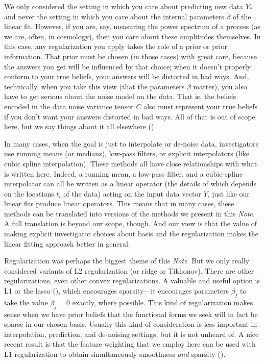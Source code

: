 \documentclass[12pt,letterpaper]{article}
\newcommand{\documentname}{\textsl{Note}}
\begin{document}
We only considered the setting in which you care about predicting new data $Y_\ast$ and never the setting in which you care about the internal parameters $\beta$ of the linear fit.
However, if you are, say, measuring the power spectrum of a process (as we are, often, in cosmology), then you care about these amplitudes themselves.
In this case, any regularization you apply takes the role of a prior or prior information.
That prior must be chosen (in those cases) with great care, because the answers you get will be influenced by that choice; when it doesn't properly conform to your true beliefs, your answers will be distorted in bad ways.
And, technically, when you take this view (that the parameters $\beta$ matter), you also have to get serious about the noise model on the data.
That is, the beliefs encoded in the data noise variance tensor $C$ also must represent your true beliefs if you don't want your answers distorted in bad ways.
All of that is out of scope here, but we say things about it all elsewhere (\citealt{fitting}).

In many cases, when the goal is just to interpolate or de-noise data, investigators use running means (or medians), low-pass filters, or explicit interpolators (like cubic spline interpolation).
These methods all have close relationships with what is written here.
Indeed, a running mean, a low-pass filter, and a cubic-spline interpolator can all be written as a linear operator (the details of which depends on the locations $t_i$ of the data) acting on the input data vector $Y$, just like our linear fits produce linear operators.
This means that in many cases, these methods can be translated into versions of the methods we present in this \documentname.
A full translation is beyond our scope, though.
And our view is that the value of making explicit investigator choices about basis and the regularization makes the linear fitting approach better in general.

Regularization was perhaps the biggest theme of this \documentname.
But we only really considered variants of L2 regularization (or ridge or Tikhonov).
There are other regularizations, even other convex regularizations.
A valuable and useful option is L1 or the lasso (\citealt{lasso}), which encourages sparsity---it encourages parameters $\beta_j$ to take the value $\beta_j=0$ exactly, where possible.
This kind of regularization makes sense when we have prior beliefs that the functional forms we seek will in fact be sparse in our chosen basis.
Usually this kind of consideration is less important in interpolation, prediction, and de-noising settings, but it is not unheard of.
A nice recent result is that the feature weighting that we employ here can be used with L1 regularization to obtain simultaneously smoothness \emph{and} sparsity (\citealt{rauhut2016interpolation}).
\end{document}
